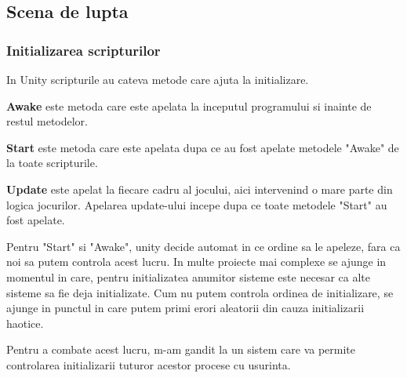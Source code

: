 \documentclass[12pt, a4paper]{article}
\begin{document}
	
	
	\subsection{Scena de lupta}
	
	
	
	
	
	\subsubsection{Initializarea scripturilor}
	\label{section: initialization}
	
	In Unity scripturile au cateva metode care ajuta la initializare.
	\newline
	
	\textbf{Awake} este metoda care este apelata la inceputul programului si inainte de restul metodelor.
	\newline
	
	\textbf{Start} este metoda care este apelata dupa ce au fost apelate metodele "Awake" de la toate scripturile.
	\newline
	
	\textbf{Update} este apelat la fiecare cadru al jocului, aici intervenind o mare parte din logica jocurilor. Apelarea update-ului incepe dupa ce toate metodele "Start" au fost apelate.
	\newline
	
	Pentru "Start" si "Awake", unity decide automat in ce ordine sa le apeleze, fara ca noi sa putem controla acest lucru. In multe proiecte mai complexe se ajunge in momentul in care, pentru initializatea anumitor sisteme este necesar ca alte sisteme sa fie deja initializate. Cum nu putem controla ordinea de initializare, se ajunge in punctul in care putem primi erori aleatorii din cauza initializarii haotice.
	\newline
	
	Pentru a combate acest lucru, m-am gandit la un sistem care va permite controlarea initializarii tuturor acestor procese cu usurinta.
	
	
\end{document}
